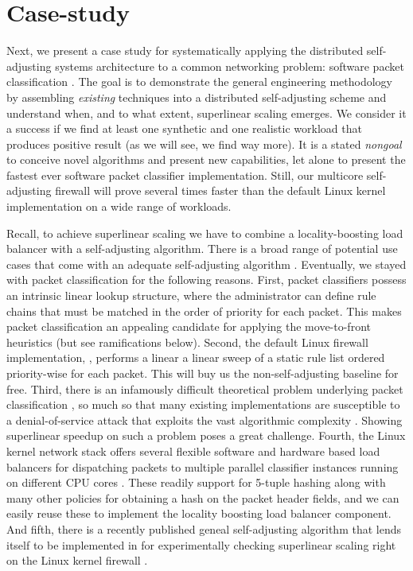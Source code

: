 \section{Case-study }\label{sec:case-study}

Next, we present a case study for systematically applying the distributed self-adjusting systems architecture to a common networking problem: software packet classification \cite{gupta2001algorithms}. The goal is to demonstrate the general engineering methodology by assembling \emph{existing} techniques into a distributed self-adjusting scheme and understand when, and to what extent, superlinear scaling emerges. We consider it a success if we find at least one synthetic and one realistic workload that produces positive result (as we will see, we find way more). It is a stated \emph{nongoal} to conceive novel algorithms and present new capabilities, let alone to present the fastest ever software packet classifier implementation. %
Still, our multicore self-adjusting firewall will prove several times faster than the default Linux kernel implementation on a wide range of workloads.

Recall, to achieve superlinear scaling we have to combine a locality-boosting load balancer with a self-adjusting algorithm. There is a broad range of potential use cases that come with an adequate self-adjusting algorithm \cite{SleatorT85Splay, BentleyCL93, HesterH85, HesterH85, BentleySTW86, Avin0020, ParkM12}. Eventually, we stayed with packet classification for the following reasons. First, packet classifiers possess an intrinsic linear lookup structure, where the administrator can define rule chains that must be matched in the order of priority for each packet. This makes packet classification an appealing candidate for applying the move-to-front heuristics (but see ramifications below). Second, the default Linux firewall implementation, \nftables, performs a linear a linear sweep of a static rule list ordered priority-wise for each packet. This will buy us the non-self-adjusting baseline for free. Third, there is an infamously difficult theoretical problem underlying packet classification \cite{10.1145/2619239.2626294,10.1006/jagm.1996.0063, PacutVAPRS2022, 10.1145/2619239.2626294, 10.1145/1851182.1851208, 10.1145/863955.863980, gupta2001algorithms}, so much so that many existing implementations \cite{Srinivasan1999,188960} are susceptible to a denial-of-service attack that exploits the vast algorithmic complexity \cite{10.1145/3359989.3365431}. Showing superlinear speedup on such a problem poses a great challenge. Fourth, the Linux kernel network stack offers several flexible software and hardware based load balancers for dispatching packets to multiple parallel classifier instances running on different CPU cores \cite{rss-linux}. These readily support for 5-tuple hashing along with many other policies for obtaining a hash on the packet header fields, and we can easily reuse these to implement the locality boosting load balancer component. And fifth, there is a recently published geneal self-adjusting algorithm that lends itself to be implemented in \nftables for experimentally checking superlinear scaling right on the Linux kernel firewall \cite{10228937}.

